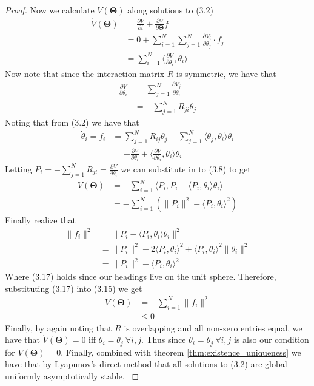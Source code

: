 \documentclass[11pt,a4paper]{article}
\numberwithin{equation}{section}
\newcommand{\T}{\mathbf{\Theta}}
\theoremstyle{definition}
\theoremstyle{assumption}
\begin{document}
\begin{proof}
Now we calculate $\dot V(\T)$ along solutions to (3.2)
\begin{align}
    \dot V(\T) &= \frac{\partial V}{\partial t} + 
    \frac{\partial V}{\partial \T}{f} \\
    &= 0 + \sum_{i=1}^N \sum_{j=1}^N \frac{\partial V_i}{\partial \theta_j} \cdot f_j \\
    &= \sum_{i=1}^N \langle \frac{\partial V}{\partial \theta_i}, \dot \theta_i \rangle
\end{align}
Now note that since the interaction matrix $R$ is symmetric, we have that
\begin{align}
    \frac{\partial V}{\partial \theta_i} &= \sum_{j=1}^N \frac{\partial V_j}{\partial \theta_i} \\
    &= -\sum_{j=1}^N R_{ji} \theta_j
\end{align}
Noting that from (3.2) we have that
\begin{align}
    \dot \theta_i = f_i &= \sum_{j=1}^N R_{ij}\theta_j - \sum_{j=1}^N \langle \theta_j, \theta_i \rangle \theta_i\\
    &= -\frac{\partial V}{\partial \theta_i} + \langle \frac{\partial V}{\partial \theta_i}, \theta_i \rangle \theta_i
\end{align}
Letting $P_i = -\sum_{j=1}^N R_{ji} = \frac{\partial V}{\partial \theta_i}$ we can substitute in to 
(3.8) to get 
\begin{align}
\dot V(\T) &=  - \sum_{i=1}^N \langle P_i, P_i - \langle P_i, \theta_i \rangle \theta_i \rangle \\
&= - \sum_{i=1}^N \left( \|P_i\|^2 - \langle P_i, \theta_i \rangle^2 \right)
\end{align}
Finally realize that 
\begin{align}
    \|f_i\|^2 &= \|P_i - \langle P_i, \theta_i \rangle \theta_i\|^2 \\
    &= \|P_i\|^2 - 2\langle P_i, \theta_i \rangle^2 + \langle P_i, \theta_i \rangle^2\|\theta_i\|^2\\
    &= \|P_i\|^2 - \langle P_i, \theta_i \rangle^2
\end{align}
Where (3.17) holds since our headings live on the unit sphere. Therefore, substituting (3.17) into (3.15) we get
\begin{align}
    \dot V(\T) &= - \sum_{i=1}^N \|f_i\|^2\\
    &\leq 0
\end{align}
Finally, by again noting that $R$  is overlapping and all non-zero entries equal, we have that $\dot V(\T)=0$ iff $\theta_i=\theta_j \ \forall i,j$.
Thus since  $\theta_i=\theta_j \ \forall i,j$ is also our condition for $V(\T)=0$. Finally, combined with theorem \ref{thm:existence_uniqueness} we have that by Lyapunov's direct method that
all solutions to (3.2) are global uniformly asymptotically stable.  \cite{lyapunov_stability_theory} 
\qedhere
\end{proof}
\end{document}
